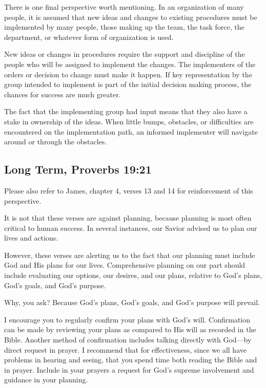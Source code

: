 \documentclass[12pt]{memoir}
\begin{document}
There is one final perspective worth mentioning. In an organization
of many people, it is assumed that new ideas and changes to existing
procedures must be implemented by many people, those making up the team, the task force, the department, or whatever form of organization is used.

New ideas or changes in procedures require the support and discipline of the people who will be assigned to implement the changes. The implementers of the orders or decision to change must make it happen. If key representation by the group intended to implement is part of
the initial decision making process, the chances for success are much greater.

The fact that the implementing group had input means that they also have a stake in ownership of the ideas. When little bumps, obstacles, or difficulties are encountered on the implementation path, an informed implementer will navigate around or through the obstacles. 

\subsection[Long Term]{Long Term, Proverbs 19:21}
 

Please also refer to James, chapter 4, verses 13 and 14 for reinforcement of this perspective.

It is not that these verses are against planning,
because planning is most often critical to human success. In several
instances, our Savior advised us to plan our lives and actions.

However, these verses are alerting us to the fact that our planning must include God and His plans for our lives. Comprehensive planning on our part should include evaluating our options, our desires, and our plans, relative to God's plans, God's goals, and God's purpose. 

Why, you ask? Because God's plans, God's goals, and God's purpose will prevail. 

I encourage you to regularly confirm your plans with God's will. Confirmation can be made by reviewing your plans as compared to His will as recorded in the Bible. Another method of confirmation includes talking directly with God---by direct request in prayer. I recommend that for effectiveness, since we all have problems in hearing and seeing, that you spend time both reading the Bible and in prayer. Include in your prayers a request for God's supreme involvement and guidance in your planning.
\end{document}
